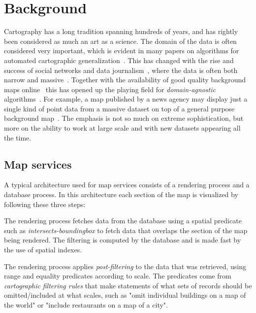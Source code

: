 \section{Background}
\label{sec:background}


Cartography has a long tradition spanning hundreds of years, and has rightly been considered as much an art as a science. The domain of the data is often considered very important, which is evident in many papers on algorithms for automated cartographic generalization~\cite{areaagg,ordnance,another}. This has changed with the rise and success of social networks and data journalism~\cite{datajournalism}, where the data is often both narrow and massive~\cite{twitter,datablog}. Together with the availability of good quality background maps online~\cite{bing,google,osm} this has opened up the playing field for \emph{domain-agnostic} algorithms~\cite{fusiontables,samet}. For example, a map published by a news agency may display just a single kind of point data from a massive dataset on top of a general purpose background map~\cite{iraq}. The emphasis is not so much on extreme sophistication, but more on the ability to work at large scale and with new datasets appearing all the time.

\subsection{Map services}

A typical architecture used for map services consists of a rendering process and a database process. In this architecture each section of the map is visualized by following these three steps:

 The rendering process fetches data from the database using a spatial predicate such as \emph{intersects-boundingbox} to fetch data that overlaps the section of the map being rendered. The filtering is computed by the database and is made fast by the use of spatial indexes.

 The rendering process applies \emph{post-filtering} to the data that was retrieved, using range and equality predicates according to scale. The predicates come from \emph{cartographic filtering rules} that make statements of what sets of records should be omitted/included at what scales, such as "omit individual buildings on a map of the world" or "include restaurants on a map of a city".


